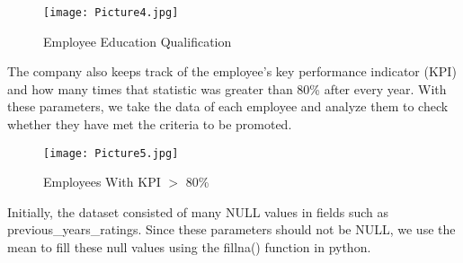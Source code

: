 \documentclass[11pt,conference]{IEEEtran}
\begin{document}
\begin{figure}[htbp!]
\centerline{\texttt{[image: Picture4.jpg]}}
\caption{Employee Education Qualification}
\label{fig}
\end{figure}

The company also keeps track of the employee’s key performance indicator (KPI) and how many times that statistic was greater than 80\% after every year. With these parameters, we take the data of each employee and analyze them to check whether they have met the criteria to be promoted.

\begin{figure}[htbp!]
\centerline{\texttt{[image: Picture5.jpg]}}
\caption{Employees With KPI $>$ 80\%}
\label{fig}
\end{figure}

Initially, the dataset consisted of many NULL values in fields such as previous\_years\_ratings. Since these parameters should not be NULL, we use the mean to fill these null values using the fillna() function in python.
\end{document}
